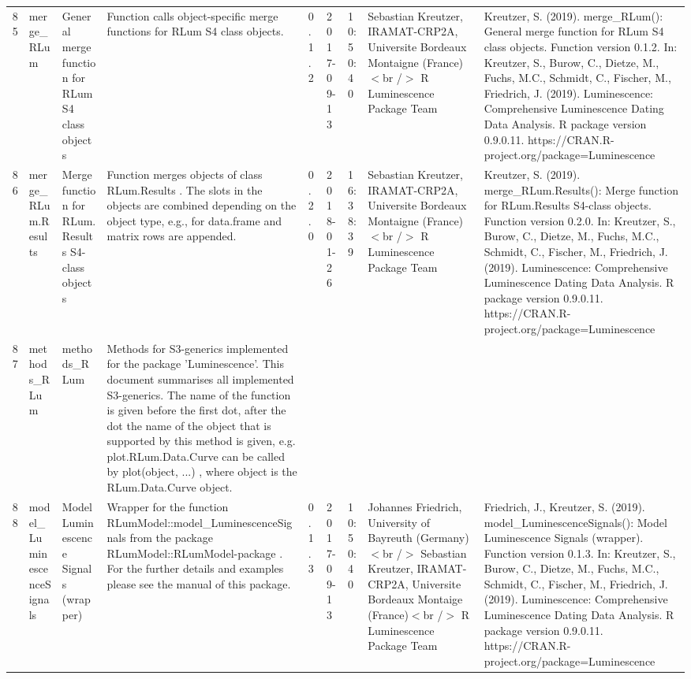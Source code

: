 \begin{table}[ht]
\begin{tabular}{rllllllll}
 \\ 
  85 & merge\_RLum & General merge function for RLum S4 class objects & Function calls object-specific merge functions for RLum S4 class objects. & 0.1.2 & 2017-09-13 & 10:50:40
 & Sebastian Kreutzer, IRAMAT-CRP2A, Universite Bordeaux Montaigne (France)$<$br /$>$  R Luminescence Package Team & Kreutzer, S. (2019). merge\_RLum(): General merge function for RLum S4 class objects. Function version 0.1.2. In: Kreutzer, S., Burow, C., Dietze, M., Fuchs, M.C., Schmidt, C., Fischer, M., Friedrich, J. (2019). Luminescence: Comprehensive Luminescence Dating Data Analysis. R package version 0.9.0.11. https://CRAN.R-project.org/package=Luminescence
 \\ 
  86 & merge\_RLum.Results & Merge function for RLum.Results S4-class objects & Function merges objects of class  RLum.Results . The slots in the objects are combined depending on the object type, e.g., for  data.frame  and  matrix  rows are appended. & 0.2.0 & 2018-01-26 & 16:38:39
 & Sebastian Kreutzer, IRAMAT-CRP2A, Universite Bordeaux Montaigne (France)$<$br /$>$  R Luminescence Package Team & Kreutzer, S. (2019). merge\_RLum.Results(): Merge function for RLum.Results S4-class objects. Function version 0.2.0. In: Kreutzer, S., Burow, C., Dietze, M., Fuchs, M.C., Schmidt, C., Fischer, M., Friedrich, J. (2019). Luminescence: Comprehensive Luminescence Dating Data Analysis. R package version 0.9.0.11. https://CRAN.R-project.org/package=Luminescence
 \\ 
  87 & methods\_RLum & methods\_RLum & Methods for S3-generics implemented for the package 'Luminescence'. This document summarises all implemented S3-generics. The name of the function is given before the first dot, after the dot the name of the object that is supported by this method is given, e.g.  plot.RLum.Data.Curve  can be called by  plot(object, ...) , where  object  is the  RLum.Data.Curve  object. &  &  &  &  &  \\ 
  88 & model\_LuminescenceSignals & Model Luminescence Signals (wrapper) & Wrapper for the function  RLumModel::model\_LuminescenceSignals  from the package RLumModel::RLumModel-package . For the further details and examples please see the manual of this package. & 0.1.3 & 2017-09-13 & 10:50:40
 & Johannes Friedrich, University of Bayreuth (Germany)  $<$br /$>$ Sebastian Kreutzer, IRAMAT-CRP2A, Universite Bordeaux Montaige (France)$<$br /$>$  R Luminescence Package Team & Friedrich, J., Kreutzer, S. (2019). model\_LuminescenceSignals(): Model Luminescence Signals (wrapper). Function version 0.1.3. In: Kreutzer, S., Burow, C., Dietze, M., Fuchs, M.C., Schmidt, C., Fischer, M., Friedrich, J. (2019). Luminescence: Comprehensive Luminescence Dating Data Analysis. R package version 0.9.0.11. https://CRAN.R-project.org/package=Luminescence

\end{tabular}
\end{table}
